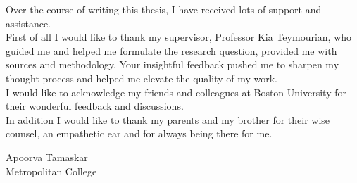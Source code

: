 Over the course of writing this thesis, I have received lots of support and assistance.\\
First of all I would like to thank my supervisor, Professor Kia Teymourian, who guided me and helped me formulate the research question, provided me with sources and methodology. Your insightful feedback pushed me to sharpen my thought process and helped me elevate the quality of my work.\\
I would like to acknowledge my friends and colleagues at Boston University for their wonderful feedback and discussions.\\
In addition I would like to thank my parents and my brother for their wise counsel, an empathetic ear and for always being there for me.
\vskip 1in

\noindent
Apoorva Tamaskar\\
Metropolitan College
